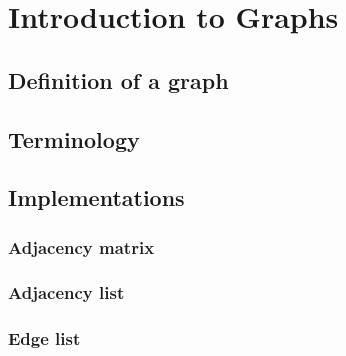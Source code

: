 \chapter{Introduction to Graphs}
\label{chap:intrographs}

\section{Definition of a graph}

\section{Terminology}

\section{Implementations}
\subsection{Adjacency matrix}
\subsection{Adjacency list}
\subsection{Edge list}